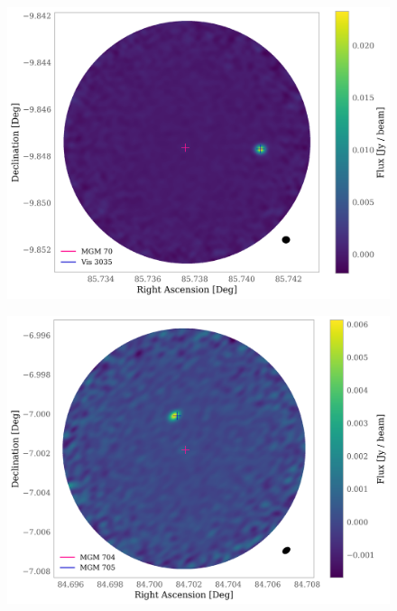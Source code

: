 \documentclass{aa}
\begin{document}
\begin{appendix}
\begin{figure}
\centering
   \includegraphics[width=\columnwidth]{MGM_70.png}
     \caption{}
\end{figure}

\begin{figure}
\centering
   \includegraphics[width=\columnwidth]{MGM_704.png}
     \caption{}
\end{figure}


\end{appendix}
\end{document}
